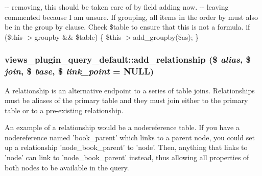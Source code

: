 -\/-\/ removing, this should be taken care of by field adding now. -\/-\/ leaving commented because I am unsure. If grouping, all items in the order by must also be in the group by clause. Check \$table to ensure that this is not a formula. if (\$this-\/$>$groupby \&\& \$table) \{ \$this-\/$>$add\_\-groupby(\$as); \}\hypertarget{classviews__plugin__query__default_a01f5ea8c8b5e5e472f8303e5af185d8e}{
\subsubsection[{add\_\-relationship}]{\setlength{\rightskip}{0pt plus 5cm}views\_\-plugin\_\-query\_\-default::add\_\-relationship (\$ {\em alias}, \/  \$ {\em join}, \/  \$ {\em base}, \/  \$ {\em link\_\-point} = {\ttfamily NULL})}}
\label{classviews__plugin__query__default_a01f5ea8c8b5e5e472f8303e5af185d8e}
A relationship is an alternative endpoint to a series of table joins. Relationships must be aliases of the primary table and they must join either to the primary table or to a pre-\/existing relationship.

An example of a relationship would be a nodereference table. If you have a nodereference named 'book\_\-parent' which links to a parent node, you could set up a relationship 'node\_\-book\_\-parent' to 'node'. Then, anything that links to 'node' can link to 'node\_\-book\_\-parent' instead, thus allowing all properties of both nodes to be available in the query.


